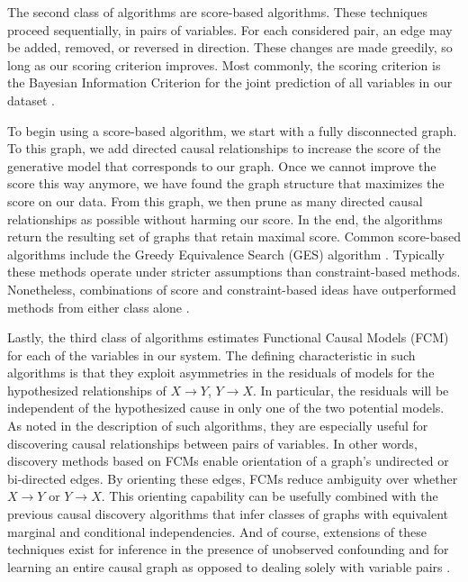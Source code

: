 The second class of algorithms are score-based algorithms.
These techniques proceed sequentially, in pairs of variables.
For each considered pair, an edge may be added, removed, or reversed in direction.
These changes are made greedily, so long as our scoring criterion improves.
Most commonly, the scoring criterion is the Bayesian Information Criterion for the joint prediction of all variables in our dataset \citep{malinsky_2018_causal}.

To begin using a score-based algorithm, we start with a fully disconnected graph.
To this graph, we add directed causal relationships to increase the score of the generative model that corresponds to our graph.
Once we cannot improve the score this way anymore, we have found the graph structure that maximizes the score on our data.
From this graph, we then prune as many directed causal relationships as possible without harming our score.
In the end, the algorithms return the resulting set of graphs that retain maximal score.
Common score-based algorithms include the Greedy Equivalence Search (GES) algorithm \citep{chickering_2002_optimal}.
Typically these methods operate under stricter assumptions than constraint-based methods.
Nonetheless, combinations of score and constraint-based ideas have outperformed methods from either class alone \citep{glymour_2019_review}.

Lastly, the third class of algorithms estimates Functional Causal Models (FCM) \citep{goudet_2018_learning} for each of the variables in our system.
The defining characteristic in such algorithms is that they exploit asymmetries in the residuals of models for the hypothesized relationships of $X \rightarrow Y$, $Y \rightarrow X$.
In particular, the residuals will be independent of the hypothesized cause in only one of the two potential models.
As noted in the description of such algorithms, they are especially useful for discovering causal relationships between pairs of variables.
In other words, discovery methods based on FCMs enable orientation of a graph's undirected or bi-directed edges.
By orienting these edges, FCMs reduce ambiguity over whether $X \rightarrow Y$ or $Y \rightarrow X$.
This orienting capability can be usefully combined with the previous causal discovery algorithms that infer classes of graphs with equivalent marginal and conditional independencies.
And of course, extensions of these techniques exist for inference in the presence of unobserved confounding \citep[Sec. 6]{goudet_2018_learning} and for learning an entire causal graph as opposed to dealing solely with variable pairs \citep{zheng_2020_learning}.

